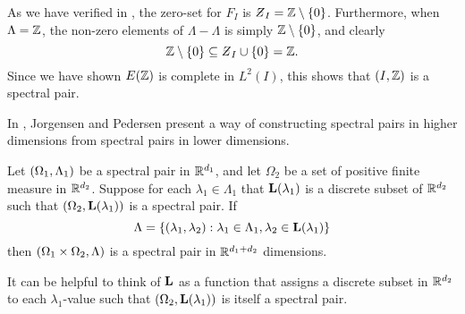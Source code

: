 \documentclass[../thesis.tex]{subfiles}
\begin{document}
\begin{example} %
    As we have verified in , the zero-set for $F_{I}$ is  $\Zstroke_{I} = \intnozero$. Furthermore, when $\Lambda=\mathbb{Z}$, the non-zero elements of $\Lambda - \Lambda$ is simply $\mathbb{Z}\setminus\{0\}$, and clearly
    \begin{equation*}
        \intnozero \subseteq \Zstroke_{I} \cup \braq{0} = \Z.
    \end{equation*}
    Since we have shown $E(\mathbb{Z})$ is complete in $L^2(I)$, this shows that $(I,\mathbb{Z})$ is a spectral pair.
\end{example}

In \cite{jorgensenSpectralPairsCartesian2001}, Jorgensen and Pedersen present a way of constructing spectral pairs in higher dimensions from spectral pairs in lower dimensions. 

\begin{theorem}\label{thrm:construction_spectra}
    Let $(\Omega_1,\Lambda_1)$ be a spectral pair in $\mathbb{R}^{d_1}$, and let $\Omega_2$ be a set of positive finite measure in $\mathbb{R}^{d_2}$. Suppose for each $\lambda_1 \in \Lambda_1$ that $\mathbf{L}(\lambda_1)$ is a discrete subset of $\mathbb{R}^{d_2}$ such that $(\Omega_2,\mathbf{L}(\lambda_1))$ is a spectral pair. If 
    \begin{equation}\label{eq:construction_spectra}
        \Lambda = \{(\lambda_1, \lambda_2): \lambda_1\in \Lambda_1, \lambda_2 \in \mathbf{L}(\lambda_1)\} 
    \end{equation}
    then $(\Omega_1\times\Omega_2, \Lambda)$ is a spectral pair in $\mathbb{R}^{d_1+d_2}$ dimensions. 
\end{theorem}

\begin{remark}
    It can be helpful to think of $\mathbf{L}$ as a function that assigns a discrete subset in $\mathbb{R}^{d_2}$ to each $\lambda_1$-value such that $(\Omega_2,\mathbf{L}(\lambda_1))$ is itself a spectral pair. %
\end{remark}
\end{document}
